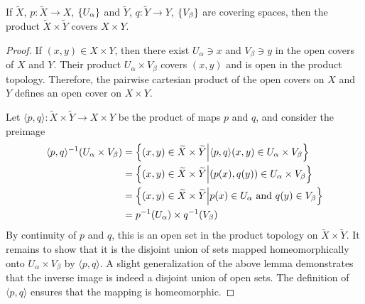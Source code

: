 \documentclass[a5paper]{article}
\newcommand{\wt}{\widetilde}
\begin{document}
\begin{proposition*}
	If $\tilde{X}$, $p:\tilde{X}\to X$, $\left\{U_\alpha\right\}$ and $\tilde{Y}$,
  $q:\tilde{Y}\to Y$, $\left\{V_\beta\right\}$ are covering spaces, then the product
  $\tilde{X}\times\tilde{Y}$ covers $X\times Y$.
\end{proposition*}
\begin{proof}
  If $(x,y)\in X\times Y$, then there exist $U_\alpha\ni x$ and $V_\beta\ni y$
  in the open covers of $X$ and $Y$. Their product $U_\alpha\times V_\beta$
  covers $(x,y)$ and is open in the product topology. Therefore, the pairwise
  cartesian product of the open covers on $X$ and $Y$ defines an open cover on
  $X\times Y$.

  Let $\langle p,q \rangle:\widetilde{X}\times \widetilde{Y}\to X\times Y$ be
  the product of maps $p$ and $q$, and consider the preimage
  \begin{align*}
    \langle p,q \rangle^{-1}(U_\alpha\times V_\beta)
    &= \braces{(x,y)\in \wt{X}\times\wt{Y}\Big|\langle p,q \rangle(x,y)\in U_\alpha\times V_\beta} \\
    &= \braces{(x,y)\in \wt{X}\times\wt{Y}\Big|(p(x),q(y))\in U_\alpha\times V_\beta} \\
    &= \braces{(x,y)\in \wt{X}\times\wt{Y}\Big|p(x)\in U_\alpha\text{ and }q(y)\in V_\beta} \\
    &= p^{-1}(U_\alpha)\times q^{-1}(V_\beta)
  \end{align*}
  By continuity of $p$ and $q$, this is an open set in the product topology on
  $\wt{X}\times \wt{Y}$.
  It remains to show that it is the disjoint union of sets
  mapped homeomorphically onto $U_\alpha\times V_\beta$ by $\langle p,q \rangle$.
  A slight generalization of the above lemma demonstrates that the inverse image
  is indeed a disjoint union of open sets. The definition of
  $\langle p,q \rangle$ ensures that the mapping is homeomorphic.
\end{proof}


\end{document}

